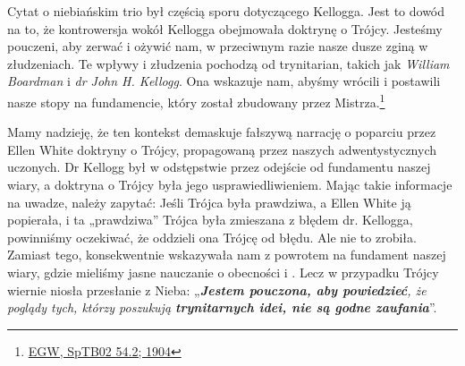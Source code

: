 Cytat o niebiańskim trio był częścią sporu dotyczącego Kellogga. Jest to dowód na to, że kontrowersja wokół Kellogga obejmowała doktrynę o Trójcy. Jesteśmy pouczeni, aby zerwać  i ożywić  nam, w przeciwnym razie nasze dusze zginą w złudzeniach. Te wpływy i złudzenia pochodzą od trynitarian, takich jak \textit{William Boardman} i \textit{dr John H. Kellogg}. Ona wskazuje nam, abyśmy wrócili i postawili nasze stopy na fundamencie, który został zbudowany przez Mistrza.\footnote{\href{https://egwwritings.org/?ref=en_SpTB02.54.2&para=417.276}{EGW, SpTB02 54.2; 1904}}

Mamy nadzieję, że ten kontekst demaskuje fałszywą narrację o poparciu przez Ellen White doktryny o Trójcy, propagowaną przez naszych adwentystycznych uczonych. Dr Kellogg był w odstępstwie przez odejście od fundamentu naszej wiary, a doktryna o Trójcy była jego usprawiedliwieniem. Mając takie informacje na uwadze, należy zapytać: Jeśli Trójca była prawdziwa, a Ellen White ją popierała, i ta „prawdziwa” Trójca była zmieszana z błędem dr. Kellogga, powinniśmy oczekiwać, że oddzieli ona Trójcę od błędu. Ale nie to zrobiła. Zamiast tego, konsekwentnie wskazywała nam z powrotem na fundament naszej wiary, gdzie mieliśmy jasne nauczanie o obecności i . Lecz w przypadku Trójcy wiernie niosła przesłanie z Nieba: „\textit{\textbf{Jestem pouczona, aby powiedzieć}, że poglądy tych, którzy poszukują \textbf{trynitarnych idei, nie są godne zaufania}}”.

